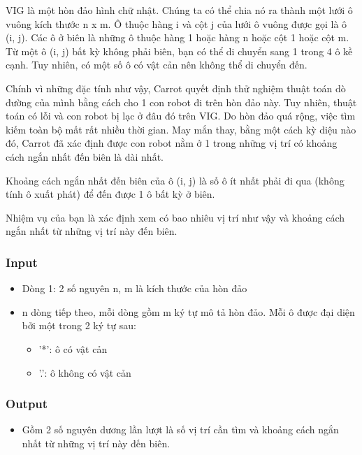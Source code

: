 

VIG là một hòn đảo hình chữ nhật. Chúng ta có thể chia nó ra thành  một lưới ô vuông kích thước n x m. Ô thuộc hàng i và cột j của lưới ô  vuông được gọi là ô (i, j). Các ô ở biên là những ô thuộc hàng 1 hoặc  hàng n hoặc cột 1 hoặc cột m. Từ một ô (i, j) bất kỳ không phải biên,  bạn có thể di chuyển sang 1 trong 4 ô kề cạnh. Tuy nhiên, có một số ô có  vật cản nên không thể di chuyển đến.

Chính vì những đặc tính như  vậy, Carrot quyết định thử nghiệm thuật toán dò đường của mình bằng cách  cho 1 con robot đi trên hòn đảo này. Tuy nhiên, thuật toán có lỗi và  con robot bị lạc ở đâu đó trên VIG. Do hòn đảo quá rộng, việc tìm kiếm  toàn bộ mất rất nhiều thời gian. May mắn thay, bằng một cách kỳ diệu nào  đó, Carrot đã xác định được con robot nằm ở 1 trong những vị trí có  khoảng cách ngắn nhất đến biên là dài nhất.

Khoảng cách ngắn nhất đến biên của ô (i, j) là số ô ít nhất phải đi qua (không tính ô xuất phát) để đến được 1 ô bất kỳ ở biên.

Nhiệm vụ của bạn là xác định xem có bao nhiêu vị trí như vậy và khoảng cách ngắn nhất từ những vị trí này đến biên.

\subsubsection{Input}
\begin{itemize}
	\item Dòng 1: 2 số nguyên n, m là kích thước của hòn đảo
	\item n dòng tiếp theo, mỗi dòng gồm m ký tự mô tả hòn đảo. Mỗi ô được đại diện bởi một trong 2 ký tự sau:

\begin{itemize}
	\item '*': ô có vật cản
	\item '.': ô không có vật cản
\end{itemize}
\end{itemize}

\subsubsection{Output}
\begin{itemize}
	\item Gồm 2 số nguyên dương lần lượt là số vị trí cần tìm và khoảng cách ngắn nhất từ những vị trí này đến biên.
\end{itemize}

